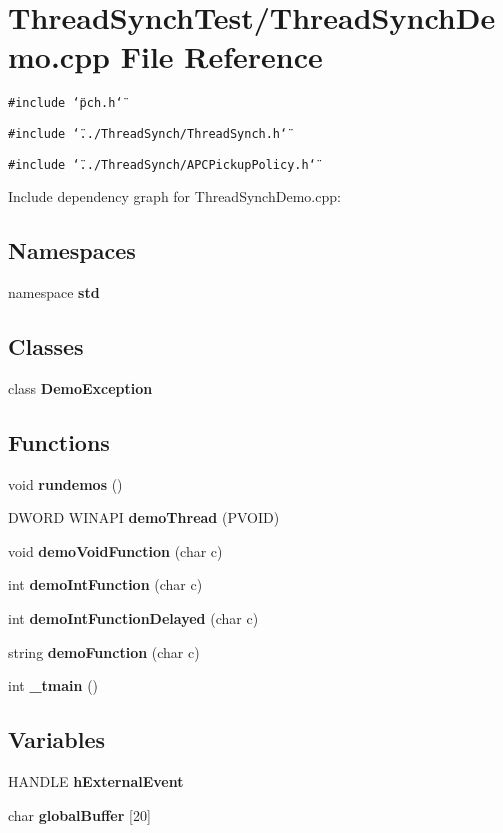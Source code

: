 \section{Thread\-Synch\-Test/Thread\-Synch\-Demo.cpp File Reference}
\label{_thread_synch_demo_8cpp}
{\tt \#include \char`\"{}pch.h\char`\"{}}\par
{\tt \#include \char`\"{}../Thread\-Synch/Thread\-Synch.h\char`\"{}}\par
{\tt \#include \char`\"{}../Thread\-Synch/APCPickup\-Policy.h\char`\"{}}\par


Include dependency graph for Thread\-Synch\-Demo.cpp:\subsection*{Namespaces}
\begin{CompactItemize}
\item 
namespace {\bf std}
\end{CompactItemize}
\subsection*{Classes}
\begin{CompactItemize}
\item 
class {\bf Demo\-Exception}
\end{CompactItemize}
\subsection*{Functions}
\begin{CompactItemize}
\item 
void {\bf rundemos} ()
\item 
DWORD WINAPI {\bf demo\-Thread} (PVOID)
\item 
void {\bf demo\-Void\-Function} (char c)
\item 
int {\bf demo\-Int\-Function} (char c)
\item 
int {\bf demo\-Int\-Function\-Delayed} (char c)
\item 
string {\bf demo\-Function} (char c)
\item 
int {\bf \_\-tmain} ()
\end{CompactItemize}
\subsection*{Variables}
\begin{CompactItemize}
\item 
HANDLE {\bf h\-External\-Event}
\item 
char {\bf global\-Buffer} [20]
\end{CompactItemize}


